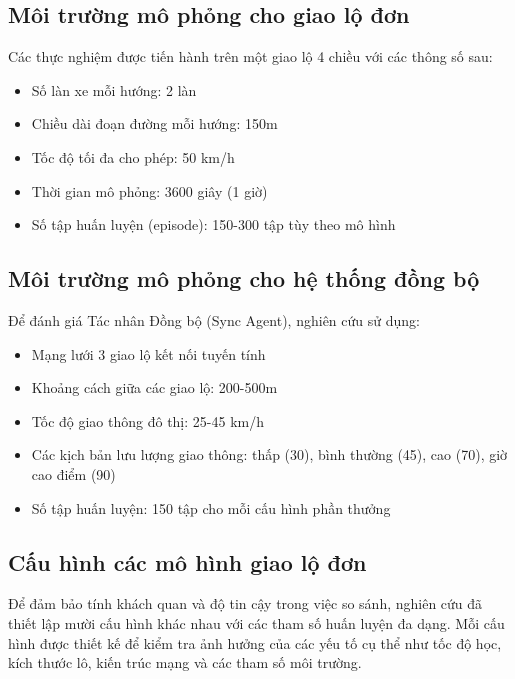\subsection{Môi trường mô phỏng cho giao lộ đơn}
Các thực nghiệm được tiến hành trên một giao lộ 4 chiều với các thông số sau:
\begin{itemize}
    \item Số làn xe mỗi hướng: 2 làn

    \item Chiều dài đoạn đường mỗi hướng: 150m

    \item Tốc độ tối đa cho phép: 50 km/h

    \item Thời gian mô phỏng: 3600 giây (1 giờ)

    \item Số tập huấn luyện (episode): 150-300 tập tùy theo mô hình
\end{itemize}

\subsection{Môi trường mô phỏng cho hệ thống đồng bộ}
Để đánh giá Tác nhân Đồng bộ (Sync Agent), nghiên cứu sử dụng:
\begin{itemize}
    \item Mạng lưới 3 giao lộ kết nối tuyến tính

    \item Khoảng cách giữa các giao lộ: 200-500m

    \item Tốc độ giao thông đô thị: 25-45 km/h

    \item Các kịch bản lưu lượng giao thông: thấp (30), bình thường (45), cao (70), giờ cao
        điểm (90)

    \item Số tập huấn luyện: 150 tập cho mỗi cấu hình phần thưởng
\end{itemize}

\subsection{Cấu hình các mô hình giao lộ đơn}

Để đảm bảo tính khách quan và độ tin cậy trong việc so sánh, nghiên cứu đã thiết
lập mười cấu hình khác nhau với các tham số huấn luyện đa dạng. Mỗi cấu hình
được thiết kế để kiểm tra ảnh hưởng của các yếu tố cụ thể như tốc độ học, kích thước
lô, kiến trúc mạng và các tham số môi trường.

